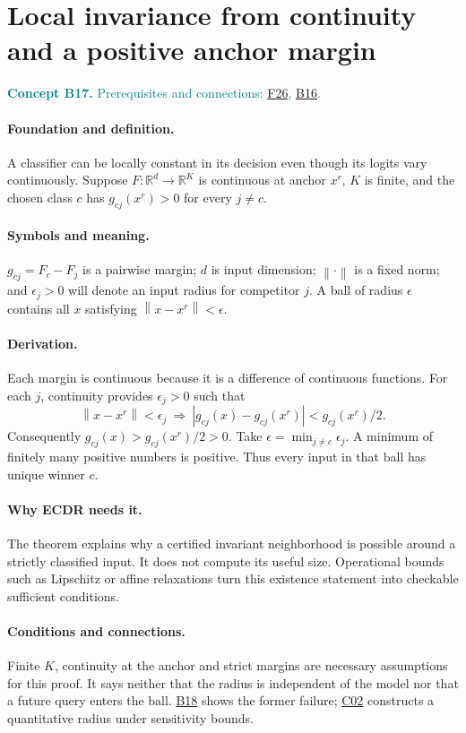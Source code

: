 \documentclass[11pt,a4paper]{article}
\newcommand{\R}{\mathbb R}
\newcommand{\norm}[1]{\left\lVert#1\right\rVert}
\newcommand{\conceptid}{Front matter}
\newcommand{\concept}[3]{\clearpage\renewcommand{\conceptid}{#1}%
\section{#2}\label{concept:#1}%
\textcolor{teal}{\textbf{Concept #1.} Prerequisites and connections: #3.}\par
\typeout{ECDR-CONCEPT-START #1 PAGE=\thepage}}
\begin{document}
\concept{B17}{Local invariance from continuity and a positive anchor margin}{\hyperref[concept:F26]{F26}, \hyperref[concept:B16]{B16}}
\paragraph{Foundation and definition.}
A classifier can be locally constant in its decision even though its
logits vary continuously. Suppose $F:\R^d\to\R^K$ is continuous at
anchor $x^r$, $K$ is finite, and the chosen class $c$ has
$g_{cj}(x^r)>0$ for every $j\ne c$.
\paragraph{Symbols and meaning.}
$g_{cj}=F_c-F_j$ is a pairwise margin; $d$ is input dimension;
$\norm{\cdot}$ is a fixed norm; and $\epsilon_j>0$ will denote an
input radius for competitor $j$. A ball of radius $\epsilon$ contains
all $x$ satisfying $\norm{x-x^r}<\epsilon$.
\paragraph{Derivation.}
Each margin is continuous because it is a difference of continuous
functions. For each $j$, continuity provides $\epsilon_j>0$ such that
\[
 \norm{x-x^r}<\epsilon_j
 \ \Longrightarrow\
 |g_{cj}(x)-g_{cj}(x^r)|<g_{cj}(x^r)/2.
\]
Consequently $g_{cj}(x)>g_{cj}(x^r)/2>0$. Take
$\epsilon=\min_{j\ne c}\epsilon_j$. A minimum of finitely many positive
numbers is positive. Thus every input in that ball has unique winner $c$.
\paragraph{Why ECDR needs it.}
The theorem explains why a certified invariant neighborhood is possible
around a strictly classified input. It does not compute its useful size.
Operational bounds such as Lipschitz or affine relaxations turn this
existence statement into checkable sufficient conditions.
\paragraph{Conditions and connections.}
Finite $K$, continuity at the anchor and strict margins are necessary
assumptions for this proof. It says neither that the radius is independent
of the model nor that a future query enters the ball. \hyperref[concept:B18]{B18} shows the former
failure; \hyperref[concept:C02]{C02} constructs a quantitative radius under sensitivity bounds.
\par\label{endconcept:B17}
\end{document}
